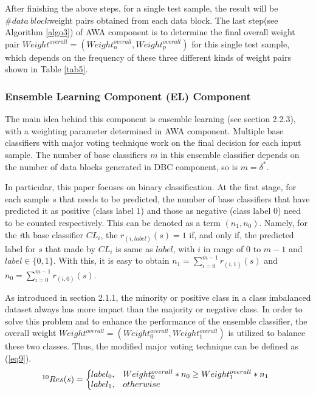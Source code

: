 After finishing the above steps, for a single test sample, the result will be $\#data\ block$\footnotemark[9] weight pairs obtained from each data block. The last step(see Algorithm \ref{algo3}) of AWA component is to determine the final overall weight pair $Weight^{overall}=\left(Weight_{n}^{overall},Weight_{p}^{overall}\right)$ for this single test sample, which depends on the frequency of these three different kinds of weight pairs shown in Table \ref{tab5}.

\subsubsection{Ensemble Learning Component (EL) Component}
The main idea behind this component is ensemble learning (see section 2.2.3), with a weighting parameter determined in AWA component. Multiple base classifiers with major voting technique work on the final decision for each input sample. The number of base classifiers $m$ in this ensemble classifier depends on the number of data blocks generated in DBC component, so is $m=\delta^{*}$.

In particular, this paper focuses on binary classification. At the first stage, for each sample $s$ that needs to be predicted, the number of base classifiers that have predicted it as positive (class label 1) and those as negative (class label 0) need to be counted respectively. This can be denoted as a term $\left(n_{1}, n_{0}\right)$. Namely, for the \textit{i}th base classifier $C L_{i}$, the $r_{(i, label)}(s)=1$ if, and only if, the predicted label for $s$ that made by $C L_{i}$ is same as $label$, with $i$ in range of 0 to $m-1$ and $label\in\{0,1\}$. With this, it is easy to obtain $n_{1}=\sum_{i=0}^{m-1} r_{(i, 1)}(s)$ and $n_{0}=\sum_{i=0}^{m-1} r_{(i, 0)}(s)$.

As introduced in section 2.1.1, the minority or positive class in a class imbalanced dataset always has more impact than the majority or negative class. In order to solve this problem and to enhance the performance of the ensemble classifier, the overall weight $Weight^{overall}=\left(Weight_0^{overall},Weight_1^{overall}\right)$ is utilized to balance these two classes. Thus, the modified major voting technique can be defined as (\ref{eq9}).
\begin{equation}\label{eq9}\footnotemark[10]
    Res(s)=\left\{\begin{array}{ll}
    \hspace{-6pt}label_{0}, & Weight_{0}^{overall} * n_{0} \geq Weight_{1}^{overall} * n_{1} \\
    \hspace{-6pt}label_{1}, & otherwise
    \end{array}\right.
\end{equation}

